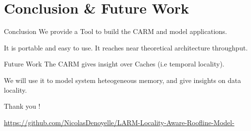 \section{Conclusion \& Future Work}

\begin{frame}
  \begin{block}{Conclusion}
    We provide a Tool to build the CARM and model applications.

    It is portable and easy to use. It reaches near theoretical architecture throughput.
  \end{block}
  \begin{block}{Future Work}
    The CARM gives insight over Caches (i.e temporal locality).

    We will use it to model system heteogeneous memory, and give insights on data locality.
    
  \end{block}
\end{frame}
    

\begin{frame}
  \vspace{1cm}
  \begin{minipage}[t][.8\textheight]{\textwidth}
  \vspace{2.5cm}
  \centering
  {\LARGE{Thank you !}}

  \vfill
  \small{\href{https://github.com/NicolasDenoyelle/LARM-Locality-Aware-Roofline-Model-}{https://github.com/NicolasDenoyelle/LARM-Locality-Aware-Roofline-Model-}}
  \end{minipage}
\end{frame}

